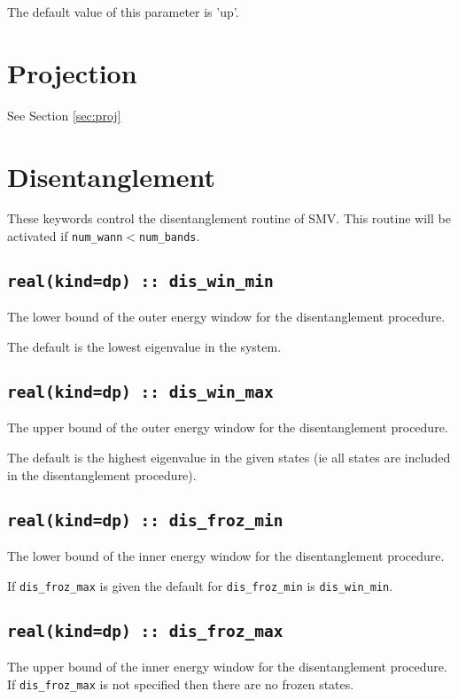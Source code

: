 The default value of this parameter is 'up'.


\section{Projection}

See Section \ref{sec:proj}



\section{Disentanglement}
These keywords control the disentanglement routine of SMV. This routine
will be activated if \verb#num_wann#$<$\verb#num_bands#.


\subsection[dis\_win\_min]{\tt real(kind=dp) :: dis\_win\_min}
The lower bound of the outer energy window for the disentanglement
procedure.

The default is the lowest eigenvalue in the system.

\subsection[dis\_win\_max]{\tt real(kind=dp) :: dis\_win\_max}
The upper bound of the outer energy window for the disentanglement
procedure.

The default is the highest eigenvalue in the given states (ie all states
are included in the disentanglement procedure).

\subsection[dis\_froz\_min]{\tt real(kind=dp) :: dis\_froz\_min}
The lower bound of the inner energy window for the disentanglement
procedure. 

If \verb#dis_froz_max# is given the default for 
\verb#dis_froz_min# is \verb#dis_win_min#.


\subsection[dis\_froz\_max]{\tt real(kind=dp) :: dis\_froz\_max}
The upper bound of the inner energy window for the disentanglement
procedure. If \verb#dis_froz_max# is  not specified then 
there are no frozen states.

